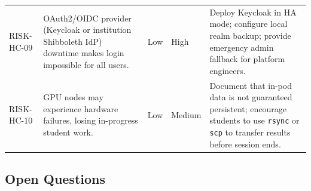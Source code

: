 \documentclass[12pt,a4paper]{article}
\begin{document}
\begin{longtable}{@{}L{2cm}L{4.5cm}L{1.5cm}L{1.5cm}L{5cm}@{}}
  RISK-HC-09 & OAuth2/OIDC provider (Keycloak or institution Shibboleth IdP) downtime makes login impossible for all users. & Low & High & Deploy Keycloak in HA mode; configure local realm backup; provide emergency admin fallback for platform engineers. \\
    RISK-HC-10 & GPU nodes may experience hardware failures, losing in-progress student work. & Low & Medium & Document that in-pod data is not guaranteed persistent; encourage students to use \texttt{rsync} or \texttt{scp} to transfer results before session ends. \\
\end{longtable}

\subsection{Open Questions}
\end{document}
